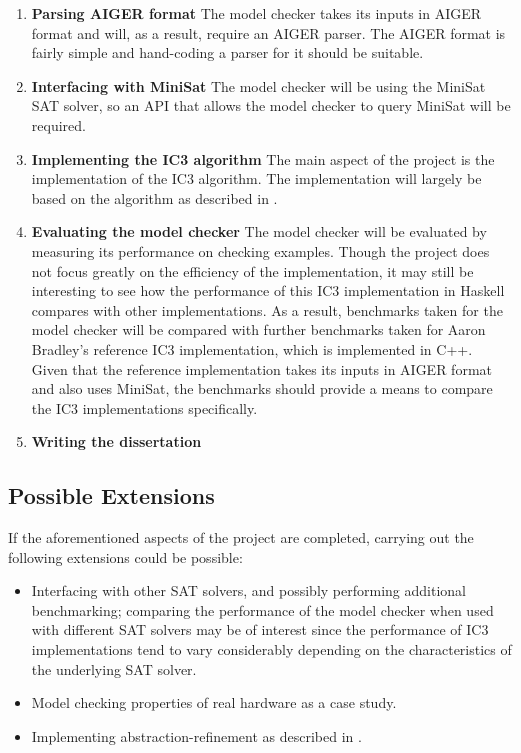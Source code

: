 \documentclass[12pt,a4paper,twoside]{article}
\begin{document}
\begin{enumerate}

\item {\bf Parsing AIGER format} The model checker takes its inputs in AIGER
format and will, as a result, require an AIGER parser. The AIGER format
is fairly simple and hand-coding a parser for it should be suitable.

\item {\bf Interfacing with MiniSat} The model checker
will be using the MiniSat SAT solver, so an API that allows the
model checker to query MiniSat will be required.

\item {\bf Implementing the IC3 algorithm} 
The main aspect of the project is the implementation of the IC3 algorithm.
The implementation will largely be based on the algorithm as described in
\cite{bradley11,bradley12}. 

\item {\bf Evaluating the model checker}
The model checker will be evaluated by measuring its performance on
checking examples. Though the project does not focus greatly on the
efficiency of the implementation, it may still be interesting to
see how the performance of this IC3 implementation in Haskell compares with
other implementations. As a result, benchmarks taken for the
model checker will be compared with further benchmarks taken for
Aaron Bradley's reference IC3 implementation, which is
implemented in C++.
Given that the reference implementation takes its inputs in AIGER format
and also uses MiniSat, the benchmarks should provide a means to compare
the IC3 implementations specifically.

\item {\bf Writing the dissertation}

\end{enumerate}

\subsection*{Possible Extensions}
If the aforementioned aspects of the project are completed, carrying out
the following extensions could be possible:
\begin{itemize}
\item Interfacing with other SAT solvers, and possibly performing additional
benchmarking; comparing the performance of the model checker when used with
different SAT solvers may be of interest since the performance
of IC3 implementations tend to vary considerably depending on the
characteristics of the underlying SAT solver.
\item Model checking properties of real hardware as a case study.
\item Implementing abstraction-refinement as described in \cite{vizel12}.
\end{itemize}
\end{document}
